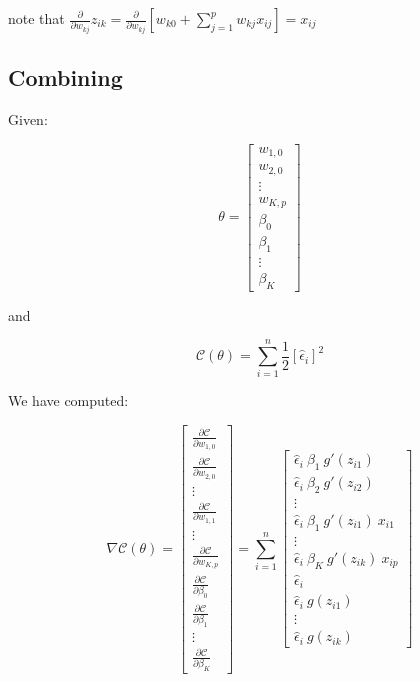 \documentclass[
]{book}
\begin{document}
note that \(\frac{\partial}{\partial w_{kj}} z_{ik} = \frac{\partial}{\partial w_{kj}} \left[w_{k0} + \sum_{j = 1}^p w_{kj} x_{ij}\right] = x_{ij}\)

\hypertarget{combining}{%
\subsection{Combining}\label{combining}}

Given:

\[
\theta =
\begin{bmatrix}
w_{1, 0} \\
w_{2, 0} \\
\vdots \\
w_{K, p} \\
\beta_{0} \\
\beta_{1} \\
\vdots \\
\beta_{K}
\end{bmatrix}
\]

and

\[\mathcal{C} (\theta) = \sum_{i = 1}^n \frac{1}{2} \left[\hat \epsilon_i\right]^2\]

We have computed:

\[
\nabla \mathcal{C} (\theta) = 
\begin{bmatrix}
\frac{\partial \mathcal{C}}{\partial w_{1, 0}}  \\
\frac{\partial \mathcal{C}}{\partial w_{2, 0}} \\
\vdots \\
\frac{\partial \mathcal{C}}{\partial w_{1, 1}} \\
\vdots \\
\frac{\partial \mathcal{C}}{\partial w_{K, p}} \\
\frac{\partial \mathcal{C}}{\partial \beta_{0}} \\
\frac{\partial \mathcal{C}}{\partial \beta_{1}} \\
\vdots \\
\frac{\partial \mathcal{C}}{\partial \beta_{K}}
\end{bmatrix} = \sum_{i = 1}^n 
\begin{bmatrix}
\hat \epsilon_i \ \beta_1 \ g'(z_{i1})  \\
\hat \epsilon_i \ \beta_2 \ g'(z_{i2}) \\
\vdots \\
\hat \epsilon_i \ \beta_1 \ g'(z_{i1}) \ x_{i1} \\
\vdots \\
\hat \epsilon_i \ \beta_K \ g'(z_{ik}) \ x_{ip} \\
\hat \epsilon_i \\
\hat \epsilon_i \ g(z_{i1}) \\
\vdots \\
\hat \epsilon_i \ g(z_{ik})
\end{bmatrix}
\]
\end{document}
